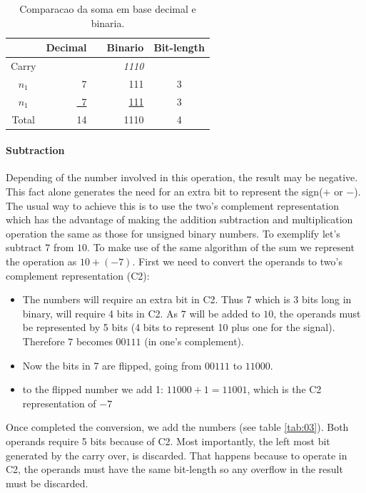 \documentclass[12pt]{article}
\begin{document}
\begin{table}[ht]
	\centering
    \caption{Comparacao da soma em base decimal e binaria.}
    \begin{tabular}{crrrc}
    \hline
    	  & Decimal & & Binario & Bit-length \\
    \hline      
    Carry & 	& & \textit{1110} & \\
    $n_1$ & 7   & & 111 & 3 \\
    $n_1$ & \underline{~7}	& & \underline{111} & 3 \\
    Total & 14	& & 1110 & 4 \\
    \hline
	\end{tabular}
    \label{tab:02}
\end{table}

\paragraph{Subtraction}
Depending of the number involved in this operation, the result may be negative.
This fact alone generates the need for an extra bit to represent the sign($+$ or
$-$). The usual way to achieve this is to use the  two's complement
\cite{flores1963logic} representation which has the advantage of making the
addition subtraction and multiplication operation the same as those for unsigned
binary numbers. To exemplify let's subtract $7$ from $10$. To make use of the
same algorithm of the sum we represent the operation as $10+(-7)$. First we
need to convert the operands to two's complement representation (C2):

\begin{itemize}
    \item The numbers will require an extra bit in C2. Thus 7 which is 3
bits long in binary, will require 4 bits in C2. As $7$ will be added to $10$,
the operands must be represented by 5 bits (4 bits to represent 10 plus one for
the signal). Therefore $7$ becomes $00111$ (in one's complement).

    \item Now the bits in 7 are flipped, going from $00111$ to $11000$.

    \item to the flipped number we add 1: $11000+1=11001$, which is the C2
representation of $-7$
\end{itemize}

Once completed the conversion, we add the numbers (see table  \ref{tab:03}).
Both operands require 5 bits because of C2. Most importantly, the left most
bit generated by the carry over, is discarded. That happens because to operate
in C2, the operands must have the same bit-length so any overflow in the result
must be discarded.
\end{document}
